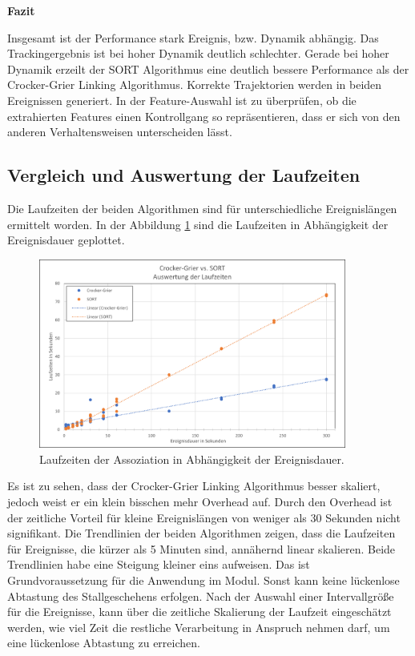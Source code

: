 \textbf{Fazit}\par
Insgesamt ist der Performance stark Ereignis, bzw. Dynamik abhängig. Das Trackingergebnis ist bei hoher Dynamik deutlich schlechter. Gerade bei hoher Dynamik erzeilt der SORT Algorithmus eine deutlich bessere Performance als der Crocker-Grier Linking Algorithmus. Korrekte Trajektorien werden in beiden Ereignissen generiert. In der Feature-Auswahl ist zu überprüfen, ob die extrahierten Features einen Kontrollgang so repräsentieren, dass er sich von den anderen Verhaltensweisen unterscheiden lässt.


\subsection{Vergleich und Auswertung der Laufzeiten}
Die Laufzeiten der beiden Algorithmen sind für unterschiedliche Ereignislängen ermittelt worden. In der Abbildung \ref{fig:plotRunTMOT} sind die Laufzeiten in Abhängigkeit der Ereignisdauer geplottet.

\begin{figure}[htb]
    \centering
    \includegraphics[width=0.9\textwidth]{img/Plots/MOT Evaluation/Assoziationsalgorithmen Laufzeiten.png}  
    \caption{Laufzeiten der Assoziation in Abhängigkeit der Ereignisdauer.}
    \label{fig:plotRunTMOT}
\end{figure}

Es ist zu sehen, dass der Crocker-Grier Linking Algorithmus besser skaliert, jedoch weist er ein klein bisschen mehr Overhead auf. Durch den Overhead ist der zeitliche Vorteil für kleine Ereignislängen von weniger als 30 Sekunden nicht signifikant. Die Trendlinien der beiden Algorithmen zeigen, dass die Laufzeiten für Ereignisse, die kürzer als 5 Minuten sind, annähernd linear skalieren. Beide Trendlinien habe eine Steigung kleiner eins aufweisen. Das ist Grundvoraussetzung für die Anwendung im Modul. Sonst kann keine lückenlose Abtastung des Stallgeschehens erfolgen. Nach der Auswahl einer Intervallgröße für die Ereignisse, kann über die zeitliche Skalierung der Laufzeit eingeschätzt werden, wie viel Zeit die restliche Verarbeitung in Anspruch nehmen darf, um eine lückenlose Abtastung zu erreichen.  \dubpar

